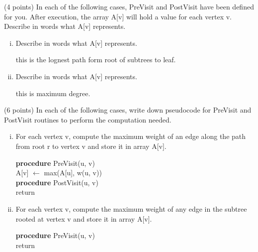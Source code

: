 \documentclass[11pt]{article}
\begin{document}
\begin{subparts}
    \item (4 points) In each of the following cases, PreVisit and PostVisit have been defined for you. After execution, the array A[v] will hold a value for each vertex v. Describe in words what A[v] represents. \par
    \begin{enumerate}[i.]
        \item Describe in words what A[v] represents. \par
        \begin{solution}
            this is the lognest path form root of subtrees to leaf.
        \end{solution}

        \item Describe in words what A[v] represents. \par
        \begin{solution}
            this is maximum degree.
        \end{solution}
    \end{enumerate}

    \item (6 points) In each of the following cases, write down pseudocode for PreVisit and PostVisit routines to perform the computation needed. \par
    \begin{enumerate}[i.]
        \item For each vertex v, compute the maximum weight of an edge along the path from root r to vertex v and store it in array A[v]. \par
        \begin{solution} \par
            \textbf{procedure} PreVisit(u, v) \\
            \quad A[v] $\leftarrow$ max(A[u], w(u, v)) \\
            
            \textbf{procedure} PostVisit(u, v) \\
            \quad return
        \end{solution}

        \item For each vertex v, compute the maximum weight of any edge in the subtree rooted at vertex v and store it in array A[v]. \par
        \begin{solution} \par
            \textbf{procedure} PreVisit(u, v) \\
            \quad return \\
            

\end{solution}
\end{enumerate}
\end{subparts}
\end{document}
